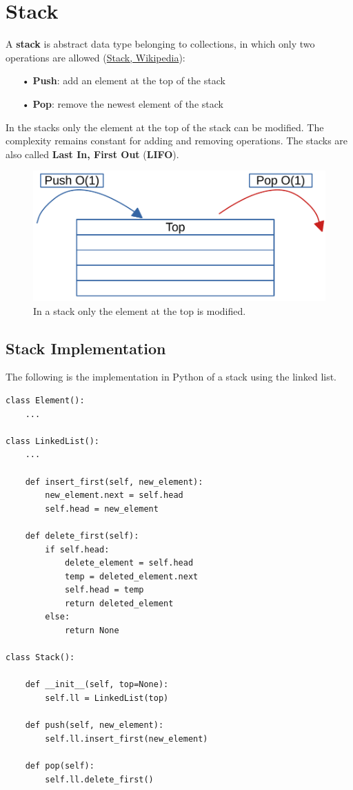 \section{Stack}
A \textbf{stack} is abstract data type belonging to collections, in which only two operations are allowed \cite{wikistack} (\href{https://en.wikipedia.org/wiki/Stack_(abstract_data_type)}{Stack, Wikipedia}):
\begin{itemize}
\item[•] \textbf{Push}: add an element at the top of the stack
\item[•] \textbf{Pop}: remove the newest element of the stack
\end{itemize}
In the stacks only the element at the top of the stack can be modified. The complexity remains constant for adding and removing operations. The stacks are also called \textbf{Last In, First Out} (\textbf{LIFO}).
\begin{figure}[H]
	\begin{center}
		\includegraphics[scale=.6]{chapters/datastructures/images/stack_1.pdf}
		\caption[In a stack only the element at the top is modified.]{In a stack only the element at the top is modified.}
		\label{stack_1}
	\end{center}
\end{figure}
\subsection{Stack Implementation}
The following is the implementation in Python of a stack using the linked list.
\begin{lstlisting}[firstnumber=1, caption={Stack implementation.}]
class Element():
	...

class LinkedList():
	...
	
	def insert_first(self, new_element):
		new_element.next = self.head
		self.head = new_element
	
	def delete_first(self):
		if self.head:
			delete_element = self.head
			temp = deleted_element.next
			self.head = temp
			return deleted_element
		else:
			return None

class Stack():
	
	def __init__(self, top=None):
		self.ll = LinkedList(top)
		
	def push(self, new_element):
		self.ll.insert_first(new_element)
	
	def pop(self):
		self.ll.delete_first()
\end{lstlisting}

